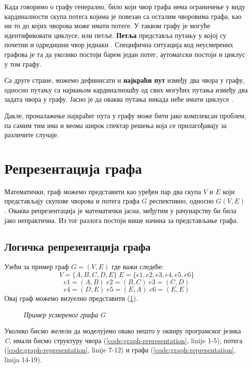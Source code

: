\par
Када говоримо о графу генерално, било који чвор графа нема ограничење у виду кардиналности скупа потега којима је повезан са осталим чворовима графа, као ни то до којих чворова може имати потеге. У таквом графу је могуће идентификовати циклусе, или петље. \textbf{Петља} представља путању у којој су почетни и одредишни чвор једнаки \cite{graph-path}. Специфична ситуација код неусмерених графова је та да уколико постоји барем један потег, аутомаtски постоји и циклус у том графу.

\par
Са друге стране, можемо дефинисати и \textbf{најкраћи пут} између два чвора у графу, односно путању са најмањом кардиналношћу од свих могућих путања између два задата чвора у графу. Јасно је да оваква путања никада неће имати циклусе \cite{graph-path}.

\par
Дакле, проналажење најкраћег пута у графу може бити јако комплексан проблем, па самим тим има и веома широк спектар решења која се прилагођавају за различите случаје. 

\section{Репрезентација графа}

\par
Математички, граф можемо представити као уређен пар два скупа $V$ и $E$ који представљају скупове чворова и потега графа $G$ респективно, односно $G(V, E)$ \cite{graph-representation}. Оваква репрезентација је математички јасна, међутим у рачунарству би била јако непрактична. Из тог разлога постоји више начина за представљање графа.

\subsection{Логичка репрезентација графа}
Узећи за пример граф $G = (V, E)$ где важи следеће:
$$ V = \{A, B, C, D, E\} \; E = \{e1, e2, e3, e4, e5, e6\} $$
$$ e1 = (A, B) \; e2 = (B, C) \; e3 = (C, D) $$
$$ e4 = (D, E) \; e5 = (E, A) \; e6 = (E, E) $$
Овај граф можемо визуелно представити (\ref{fig:directed-graph}).
\begin{figure}[!ht]
    \centering
    \caption{\textit{Пример усмереног графа $G$}}
    \label{fig:directed-graph}
\end{figure}

\par
Уколико бисмо желели да моделујемо овако нешто у оквиру програмског језика \textit{C}, имали бисмо структуру чвора (\ref{code:graph-representation}, linije 1-5), потега (\ref{code:graph-representation}, linije 7-12) и графа (\ref{code:graph-representation}, linija 14-19).

